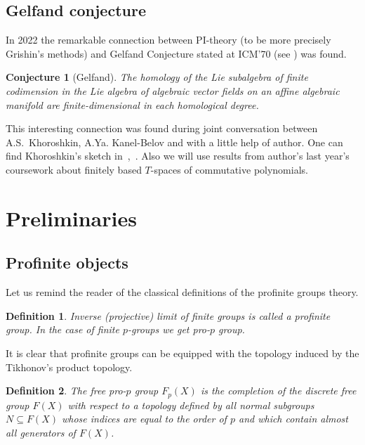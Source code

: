 \documentclass[12pt,a4paper]{article}
\newtheorem*{conjecture*}{Conjecture}
\newtheorem{definition}{Definition}[subsection]
\begin{document}
    \subsection{Gelfand conjecture}
    In 2022 the remarkable connection between PI-theory (to be more precisely Grishin's methods) and Gelfand Conjecture stated at ICM’70 (see \cite{Gelfand}) was found.
    \vskip 0.1in\noindent
    \begin{conjecture*}[Gelfand]
        The homology of the Lie subalgebra of finite codimension in the Lie algebra of algebraic vector fields on an affine algebraic manifold are finite-dimensional in each
        homological degree.
    \end{conjecture*}
    \vskip 0.1in\noindent
    This interesting connection was found during joint conversation between A.S.\ Khoroshkin, A.Ya. Kanel-Belov and with a little help of author.
    One can find Khoroshkin's sketch in~\cite{Feigin-Kanel-Khoroshkin},~\cite{Centrone-Kanel-Khoroshkin-Vorobiov}.
    Also we will use results from author's last year's coursework about finitely based $T$-spaces of commutative polynomials.


    \section{Preliminaries}

    \subsection{Profinite objects}
    Let us remind the reader of the classical definitions of the profinite groups theory.
    \vskip 0.1in\noindent
    \begin{definition}
        Inverse (projective) limit of finite groups is called a profinite group.
        In the case of finite $p$-groups we get pro-$p$ group.
    \end{definition}
    \vskip 0.1in\noindent
    It is clear that profinite groups can be equipped with the topology induced by the Tikhonov's product topology.

    \vskip 0.1in\noindent
    \begin{definition}
        The free pro-$p$ group $F_p(X)$ is the completion of the discrete free group $F(X)$ with respect to a topology defined by all normal subgroups $N \subseteq F(X)$ whose indices are equal to the order of $p$ and which contain almost all generators of $F(X)$.
    \end{definition}
    \vskip 0.1in\noindent
\end{document}
